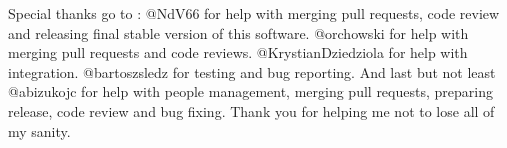 \documentclass{article}
\begin{document}
Special thanks go to : \newline\newline
@NdV66 for help with merging pull requests, code review and releasing final stable version of this software.\newline
@orchowski for help with merging pull requests and code reviews.\newline
@KrystianDziedziola for help with integration.\newline
@bartoszsledz for testing and bug reporting.\newline
\newline
And last but not least\newline
@abizukojc for help with people management, merging pull requests, preparing release, code review and bug fixing.\newline
\newline
Thank you for helping me not to lose all of my sanity.\newline
\end{document}
